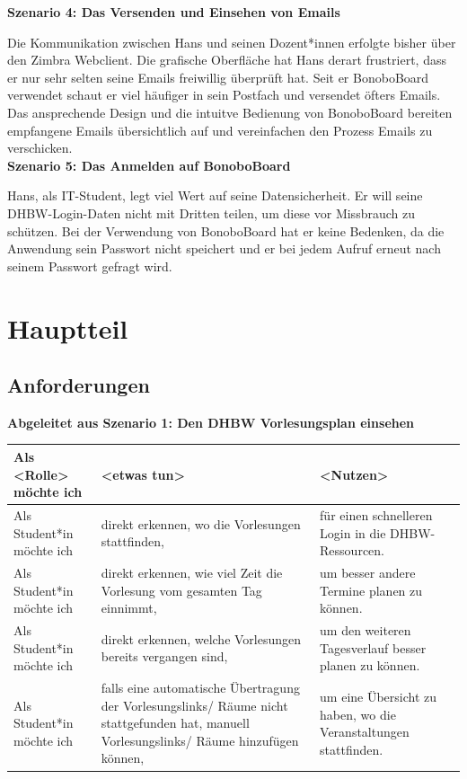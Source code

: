 \documentclass[a4paper,11pt]{scrartcl}
\begin{document}
\noindent\textbf{Szenario 4: Das Versenden und Einsehen von Emails} \par\noindent
Die Kommunikation zwischen Hans und seinen Dozent*innen erfolgte bisher über den Zimbra Webclient. Die grafische Oberfläche hat Hans derart frustriert, dass er nur sehr selten seine Emails freiwillig überprüft hat. Seit er BonoboBoard verwendet schaut er viel häufiger in sein Postfach und versendet öfters Emails. Das ansprechende Design und die intuitve Bedienung von BonoboBoard bereiten empfangene Emails  übersichtlich auf und vereinfachen den Prozess Emails zu verschicken. \\

\noindent\textbf{Szenario 5: Das Anmelden auf BonoboBoard} \par\noindent
Hans, als IT-Student, legt viel Wert auf seine Datensicherheit. Er will seine DHBW-Login-Daten nicht mit Dritten teilen, um diese vor Missbrauch zu schützen. Bei der Verwendung von BonoboBoard hat er keine Bedenken, da die Anwendung sein Passwort nicht speichert und er bei jedem Aufruf erneut nach seinem Passwort gefragt wird. 

\section{Hauptteil}
	\subsection{Anforderungen} %
\noindent\textbf{Abgeleitet aus Szenario 1: Den DHBW Vorlesungsplan einsehen}\par\noindent
\begin{table}[H]
\begin{tabular}{|p{4.5cm}|p{5cm}|p{5cm}|}
\hline
\textbf{Als <Rolle> möchte ich} &\textbf{ <etwas tun>} &\textbf{ <Nutzen>} \\ \hline
Als Student*in möchte ich & direkt erkennen, wo die Vorlesungen stattfinden, &   für einen schnelleren Login in die DHBW-Ressourcen. \\ \hline
Als Student*in möchte ich &   direkt erkennen, wie viel Zeit die Vorlesung vom gesamten Tag einnimmt,                    &  um besser andere Termine planen zu können.                       \\ \hline
Als Student*in möchte ich &  direkt erkennen, welche Vorlesungen bereits vergangen sind,                     &    um den weiteren Tagesverlauf besser planen zu können.                     \\ \hline
Als Student*in möchte ich &  falls eine automatische Übertragung der Vorlesungslinks/ Räume nicht stattgefunden hat, manuell Vorlesungslinks/ Räume hinzufügen können, &     um eine Übersicht zu haben, wo die Veranstaltungen stattfinden.                \\ \hline
\end{tabular}
\end{table}
\newpage
\end{document}
